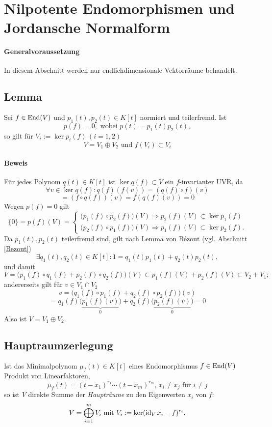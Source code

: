 \section{Nilpotente Endomorphismen und Jordansche Normalform}
\paragraph{Generalvoraussetzung}
	In diesem Abschnitt werden nur endlichdimensionale Vektorräume behandelt.
\subsection{Lemma}
	Sei $ f\in \operatorname{End}(V) $ und $ p_1(t),p_2(t)\in K[t] $ normiert und teilerfremd.
	Ist 
		\[ p(f) = 0, \text{ wobei }p(t) = p_1(t)p_2(t), \]
	so gilt für $ V_i := \ker p_i(f)\, (i=1,2)$
		\[ V=V_1\oplus V_2 \text{ und }f(V_i)\subset V_i \]
\paragraph{Beweis}
	Für jedes Polynom $ q(t)\in K[t] $ ist $ \ker q(f)\subset V $ ein $ f $-invarianter UVR, da
		\[ \forall v\in \ker q(f): q(f)(f(v)) = \left(q(f)\circ f\right)(v) \]
		\[ =\left(f\circ q(f)\right)(v) = f\left(q(f)(v)\right) = 0 \]
	Wegen $ p(f) = 0 $ gilt
		\[ \{0\} = p(f)(V) = 
		\begin{cases}
			\Big(p_1(f)\circ p_2(f)\Big)(V) \Rightarrow p_2(f)(V)\subset \ker p_1(f)\\
			\Big(p_2(f)\circ p_1(f)\Big)(V) \Rightarrow p_1(f)(V)\subset \ker p_2(f).
		\end{cases} \]
	Da $ p_1(t),p_2(t) $ teilerfremd sind, gilt nach Lemma von B\'ezout (vgl. Abschnitt \ref{Bezout})
		\[ \exists q_1(t),q_2(t)\in K[t]: 1= q_1(t)p_1(t)+q_2(t)p_2(t), \]
	und damit
		\[ V= \Big(p_1(f)\circ q_1(f)+p_2(f)\circ q_2(f) \Big)(V)\subset p_1(f)(V)+p_2(f)(V)\subset V_2+V_1; \]
	andererseits gilt für $ v\in V_1\cap V_2 $
		\[ v=\Big(q_1(f)\circ p_1(f)+q_2(f)\circ p_2(f) \Big)(v) \]
		\[ =q_1(f)\Big(\underbrace{p_1(f)(v)}_0\Big)+q_2(f)\Big(\underbrace{p_2(f)(v)}_0\Big) = 0 \]
	Also ist $ V=V_1\oplus V_2 $.
\subsection{Hauptraumzerlegung}
	Ist das Minimalpolynom $ \mu_f(t)\in K[t] $ eines Endomorphismus $ f\in \operatorname{End}(V) $ Produkt von Linearfaktoren,
		\[ \mu_f(t) = (t-x_1)^{r_1}\cdots (t-x_m)^{r_m},\, x_i\neq x_j \text{ für }i\neq j \]
	so ist $ V $ direkte Summe der \emph{Haupträume} zu den Eigenwerten $ x_i $ von $ f $:
		\[ V=\bigoplus_{i=1}^m V_i \text{ mit }V_i := \ker (\operatorname{id}_Vx_i-f)^{r_i}. \]
